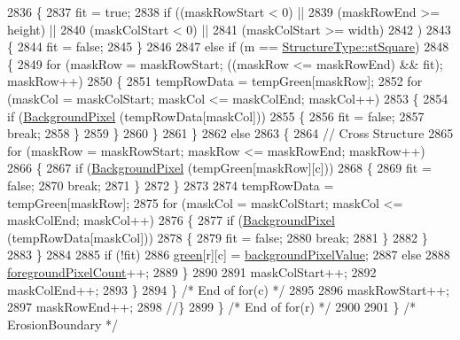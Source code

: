 \begin{DoxyCode}
2836         \{
2837           fit = \textcolor{keyword}{true};
2838           \textcolor{keywordflow}{if}  ((maskRowStart <  0)       || 
2839                (maskRowEnd   >= height)  ||  
2840                (maskColStart <  0)       ||
2841                (maskColStart >= width)
2842               )
2843           \{
2844             fit = \textcolor{keyword}{false};
2845           \}
2846 
2847           \textcolor{keywordflow}{else} \textcolor{keywordflow}{if}  (m == \hyperlink{class_k_k_b_1_1_morph_op_a09e4aff7e81327849855ff72082d85b3a04505973fd476144464695ac6483e490}{StructureType::stSquare})
2848           \{
2849             \textcolor{keywordflow}{for}  (maskRow = maskRowStart;  ((maskRow <= maskRowEnd)  &&  fit);  maskRow++)
2850             \{
2851               tempRowData =  tempGreen[maskRow];
2852               \textcolor{keywordflow}{for}  (maskCol = maskColStart;  maskCol <= maskColEnd;  maskCol++)
2853               \{
2854                 \textcolor{keywordflow}{if}  (\hyperlink{class_k_k_b_1_1_raster_a0756fb5530274d5e28858d3e1633d595}{BackgroundPixel} (tempRowData[maskCol]))
2855                 \{
2856                   fit = \textcolor{keyword}{false};
2857                   \textcolor{keywordflow}{break};
2858                 \}
2859               \}
2860             \}
2861           \}
2862           \textcolor{keywordflow}{else}
2863           \{
2864             \textcolor{comment}{//  Cross Structure}
2865             \textcolor{keywordflow}{for}  (maskRow = maskRowStart;  maskRow <= maskRowEnd;  maskRow++)
2866             \{
2867               \textcolor{keywordflow}{if}  (\hyperlink{class_k_k_b_1_1_raster_a0756fb5530274d5e28858d3e1633d595}{BackgroundPixel} (tempGreen[maskRow][c]))
2868               \{
2869                 fit = \textcolor{keyword}{false};
2870                 \textcolor{keywordflow}{break};
2871               \}
2872             \}
2873 
2874             tempRowData =  tempGreen[maskRow];
2875             \textcolor{keywordflow}{for}  (maskCol = maskColStart;  maskCol <= maskColEnd;  maskCol++)
2876             \{
2877               \textcolor{keywordflow}{if}  (\hyperlink{class_k_k_b_1_1_raster_a0756fb5530274d5e28858d3e1633d595}{BackgroundPixel} (tempRowData[maskCol]))
2878               \{
2879                 fit = \textcolor{keyword}{false};
2880                 \textcolor{keywordflow}{break};
2881               \}
2882             \}
2883           \}
2884 
2885           \textcolor{keywordflow}{if}  (!fit)
2886             \hyperlink{class_k_k_b_1_1_raster_a2d2238911145488e226cd2e34fc8448c}{green}[r][c] = \hyperlink{class_k_k_b_1_1_raster_ab7ed2191cce116a6a37029dc6e3713ef}{backgroundPixelValue};
2887           \textcolor{keywordflow}{else}
2888             \hyperlink{class_k_k_b_1_1_raster_aa7e86253f4b9c347da718732e44b60e8}{foregroundPixelCount}++;
2889         \}
2890 
2891         maskColStart++;
2892         maskColEnd++;
2893       \}
2894     \}   \textcolor{comment}{/* End of for(c) */}
2895 
2896     maskRowStart++;
2897     maskRowEnd++;
2898     \textcolor{comment}{//\}}
2899   \}   \textcolor{comment}{/* End of for(r) */}
2900 
2901 \}  \textcolor{comment}{/* ErosionBoundary */}
\end{DoxyCode}
